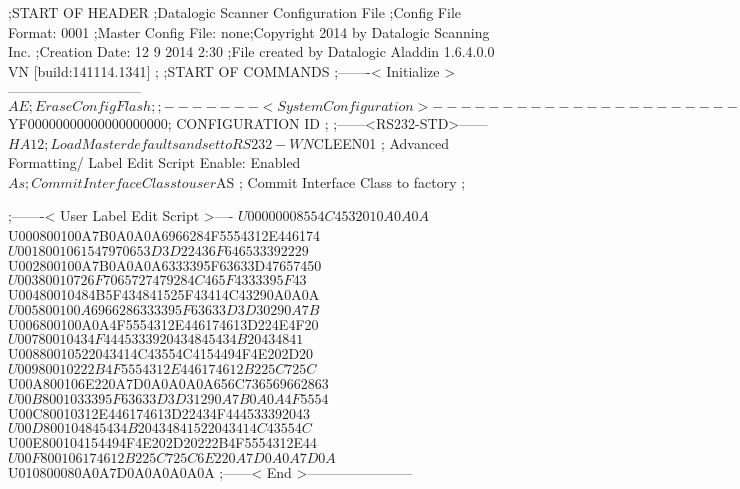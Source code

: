 ;START OF HEADER
;Datalogic Scanner Configuration File
;Config File Format: 0001
;Master Config File: none;Copyright 2014 by Datalogic Scanning Inc.
;Creation Date: 12 9 2014 2:30
;File created by Datalogic Aladdin 1.6.4.0.0 VN [build:141114.1341]
;
;START OF COMMANDS
;-------< Initialize >-----------------------------
$AE                 ; Erase Config Flash
;
;-------< System Configuration >-------------------------------
$YF00000000000000000000; CONFIGURATION ID
;
;------<RS232-STD>------
$HA12               ; Load Master defaults and set to RS232-WN
$CLEEN01            ; Advanced Formatting/ Label Edit Script Enable: Enabled
$As                 ; Commit Interface Class to user
$AS                 ; Commit Interface Class to factory
;

;-------< User Label Edit Script >----
$U00000008554C4532010A0A0A
$U000800100A7B0A0A0A6966284F5554312E446174
$U0018001061547970653D3D22436F646533392229
$U002800100A7B0A0A0A6333395F63633D47657450
$U00380010726F7065727479284C465F4333395F43
$U00480010484B5F434841525F43414C43290A0A0A
$U005800100A6966286333395F63633D3D30290A7B
$U006800100A0A4F5554312E446174613D224E4F20
$U00780010434F4445333920434845434B20434841
$U00880010522043414C43554C4154494F4E202D20
$U00980010222B4F5554312E446174612B225C725C
$U00A800106E220A7D0A0A0A0A656C736569662863
$U00B8001033395F63633D3D31290A7B0A0A4F5554
$U00C80010312E446174613D22434F444533392043
$U00D800104845434B20434841522043414C43554C
$U00E800104154494F4E202D20222B4F5554312E44
$U00F800106174612B225C725C6E220A7D0A0A7D0A
$U010800080A0A7D0A0A0A0A0A
;------< End >-----------------------
